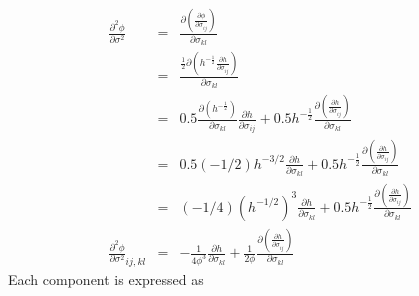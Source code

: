 \documentclass[12pt]{amsart}
\begin{document}
\begin{eqnarray}
  \label{eq:d2phiVM}
  \frac{\partial^2\phi}{\partial\sigma^2}&=&\frac{  \partial{(\frac{\partial \phi}{\partial\sigma_{ij}})  }     }{\partial \sigma_{kl}}\\
  &=&\frac{ \frac{1}{2}  \partial{(  h^{-\frac{1}{2}}\frac{\partial h}{\partial \sigma_{ij}}   )}}{\partial \sigma_{kl}} \nonumber \\
  &=& 0.5  \frac{\partial(h^{-\frac{1}{2}})}{\partial\sigma_{kl}} \frac{\partial h}{\partial \sigma_{ij}}   + 0.5 h^{-\frac{1}{2}}  \frac{\partial(  \frac{\partial h}{\partial \sigma_{ij}}   )}{\partial\sigma_{kl}}\nonumber  \\
  &=& 0.5  (-1/2)h^{-3/2} \frac{\partial h}{\partial\sigma_{kl}}  + 0.5 h^{-\frac{1}{2}}  \frac{\partial(  \frac{\partial h}{\partial \sigma_{ij}}   )}{\partial\sigma_{kl}}\nonumber  \\
  &=& (-1/4) (h^{-1/2})^3 \frac{\partial h}{\partial\sigma_{kl}}  + 0.5 h^{-\frac{1}{2}}  \frac{\partial(  \frac{\partial h}{\partial \sigma_{ij}}   )}{\partial\sigma_{kl}}\nonumber  \\
   \frac{\partial^2\phi}{\partial\sigma^2}_{ij,kl} &=& - \frac{1}{4\phi^3} \frac{\partial h}{\partial\sigma_{kl}}  + \frac{1}{2\phi}  \frac{\partial(  \frac{\partial h}{\partial \sigma_{ij}}   )}{\partial\sigma_{kl}}\nonumber
\end{eqnarray}
Each component is expressed as
\end{document}
